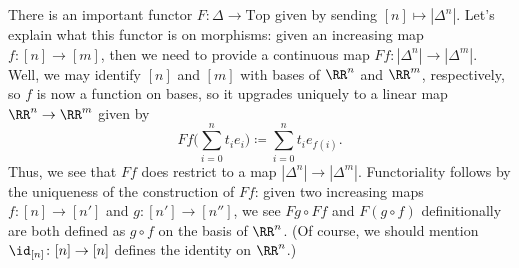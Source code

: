 \documentclass[../notes.tex]{subfiles}
\begin{document}
\begin{remark} \label{rem:simplex-maps}
	There is an important functor $F\colon\Delta\to\mathrm{Top}$ given by sending $[n]\mapsto\left|\Delta^n\right|$. Let's explain what this functor is on morphisms: given an increasing map $f\colon[n]\to[m]$, then we need to provide a continuous map $Ff\colon\left|\Delta^n\right|\to\left|\Delta^m\right|$. Well, we may identify $[n]$ and $[m]$ with bases of $\RR^n$ and $\RR^m$, respectively, so $f$ is now a function on bases, so it upgrades uniquely to a linear map $\RR^n\to\RR^m$ given by
	\[Ff\Bigg(\sum_{i=0}^nt_ie_i\Bigg)\coloneqq\sum_{i=0}^nt_ie_{f(i)}.\]
	Thus, we see that $Ff$ does restrict to a map $\left|\Delta^n\right|\to\left|\Delta^m\right|$. Functoriality follows by the uniqueness of the construction of $Ff$: given two increasing maps $f\colon[n]\to[n']$ and $g\colon[n']\to[n'']$, we see $Fg\circ Ff$ and $F(g\circ f)$ definitionally are both defined as $g\circ f$ on the basis of $\RR^n$. (Of course, we should mention $\id_{[n]}\colon[n]\to[n]$ defines the identity on $\RR^n$.)
\end{remark}
\end{document}
